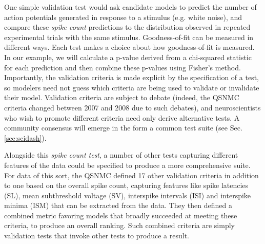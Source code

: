 \documentclass[11pt,letterpaper]{article}
\begin{document}
One simple validation test would ask candidate models to predict the number of action potentials generated in response to a stimulus (e.g. white noise), and compare these \emph{spike count} predictions to the distribution observed in repeated experimental trials with the same stimulus. 
Goodness-of-fit can be measured in different ways. Each test makes a choice about  how goodness-of-fit is measured. In our example, we will calculate a p-value derived from a chi-squared statistic for each prediction and then combine these p-values using Fisher's method\cite{fisher_statistical_1925}. Importantly, the validation criteria is made explicit by the specification of a test, so modelers need not guess which criteria are being used to validate or invalidate their model. 
Validation criteria are subject to debate (indeed, the QSNMC criteria changed between 2007 and 2008 due to such debates), and neuroscientists who wish to promote different criteria need only derive alternative tests. A community consensus will emerge in the form a common test suite (see Sec. \ref{sec:scidash}).

Alongside this \emph{spike count test}, a number of other tests capturing different features of the data could be specified to produce a more comprehensive suite. 
For data of this sort, the QSNMC defined 17 other validation criteria in addition to one based on the overall spike count, capturing features like spike latencies (SL), mean subthreshold voltage (SV), interspike intervals (ISI) and interspike minima (ISM) that can be extracted from the data\cite{jolivet_quantitative_2008}. 
They then defined a combined metric favoring models that broadly succeeded at meeting these criteria, to produce an overall ranking. 
Such combined criteria are simply validation tests that invoke other tests to produce a result.
 
\end{document}

